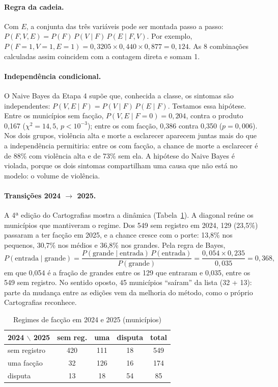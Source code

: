 \documentclass[article,12pt,oneside,a4paper,brazil,sumario=tradicional]{abntex2}
\begin{document}
\paragraph{Regra da cadeia.} Com $E$, a conjunta das três variáveis pode ser montada passo a
passo: $P(F,V,E)=P(F)\,P(V\mid F)\,P(E\mid F,V)$. Por exemplo,
$P(F{=}1,V{=}1,E{=}1)=0{,}3205\times0{,}440\times0{,}877=0{,}124$. As 8 combinações
calculadas assim coincidem com a contagem direta e somam 1.

\paragraph{Independência condicional.} O Naive Bayes da Etapa 4 supõe que, conhecida a
classe, os sintomas são independentes: $P(V,E\mid F)=P(V\mid F)\,P(E\mid F)$. Testamos essa
hipótese. Entre os municípios sem facção, $P(V,E\mid F{=}0)=0{,}204$, contra o produto
0,167 ($\chi^2=14{,}5$, $p<10^{-3}$); entre os com facção, 0,386 contra 0,350
($p=0{,}006$). Nos dois grupos, violência alta e morte a esclarecer aparecem juntas mais do
que a independência permitiria: entre os com facção, a chance de morte a esclarecer é de
88\% com violência alta e de 73\% sem ela. A hipótese do Naive Bayes é violada, porque os
dois sintomas compartilham uma causa que não está no modelo: o volume de violência.

\paragraph{Transições 2024 $\to$ 2025.} A 4ª edição do Cartografias mostra a dinâmica
(Tabela~\ref{tab:trans}). A diagonal reúne os municípios que mantiveram o regime. Dos 549
sem registro em 2024, 129 (23,5\%) passaram a ter facção em 2025, e a chance cresce com o
porte: 13,8\% nos pequenos, 30,7\% nos médios e 36,8\% nos grandes. Pela regra de Bayes,
\[
P(\text{entrada}\mid\text{grande})=\frac{P(\text{grande}\mid\text{entrada})\,P(\text{entrada})}{P(\text{grande})}=\frac{0{,}054\times0{,}235}{0{,}035}=0{,}368,
\]
em que 0,054 é a fração de grandes entre os 129 que entraram e 0,035, entre os 549 sem
registro. No sentido oposto, 45 municípios ``saíram'' da lista (32 + 13): parte da mudança
entre as edições vem da melhoria do método, como o próprio Cartografias reconhece.

\begin{table}[htbp]
\centering\small
\caption{Regimes de facção em 2024 e 2025 (municípios)}\label{tab:trans}
\begin{tabular}{@{}lcccc@{}}
\toprule
2024 $\backslash$ 2025 & sem reg. & uma & disputa & total\\
\midrule
sem registro & 420 & 111 & 18 & 549\\
uma facção & 32 & 126 & 16 & 174\\
disputa & 13 & 18 & 54 & 85\\
\bottomrule
\end{tabular}
\end{table}
\end{document}
